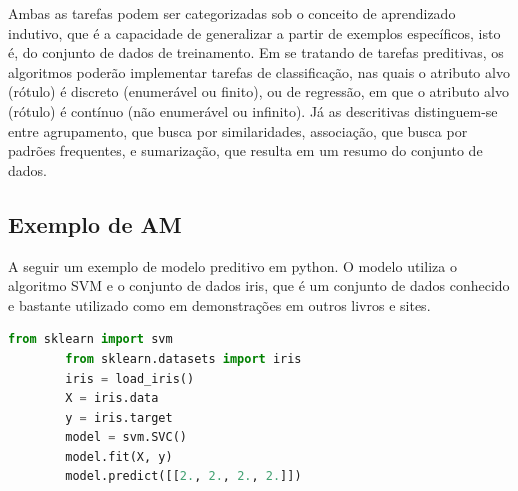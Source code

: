 \documentclass[a4paper,12pt]{book}
\begin{document}
	Ambas as tarefas podem ser categorizadas sob o conceito de aprendizado indutivo, que é a capacidade de generalizar a partir de exemplos específicos, isto é, do conjunto de dados de treinamento. Em se tratando de tarefas preditivas, os algoritmos poderão implementar tarefas de classificação, nas quais o atributo alvo (rótulo) é discreto (enumerável ou finito), ou de regressão, em que o atributo alvo (rótulo) é contínuo (não enumerável ou infinito). Já as descritivas distinguem-se entre agrupamento, que busca por similaridades, associação, que busca por padrões frequentes, e sumarização, que resulta em um resumo do conjunto de dados.
	
	
	\subsection{Exemplo de AM}
	
	A seguir um exemplo de modelo preditivo em python. O modelo utiliza o algoritmo SVM e o conjunto de dados iris, que é um conjunto de dados conhecido e bastante utilizado como em demonstrações em outros livros e sites.
	
	\begin{lstlisting}[language=Python, caption={Exemplo de código que usa AM}]
		from sklearn import svm
		from sklearn.datasets import iris
		iris = load_iris()
		X = iris.data
		y = iris.target
		model = svm.SVC()
		model.fit(X, y)
		model.predict([[2., 2., 2., 2.]])
	\end{lstlisting}
	
	
	
	
	
	
\end{document}
